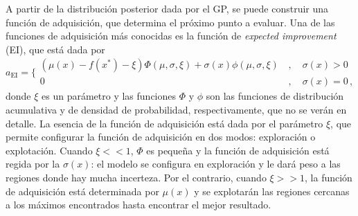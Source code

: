 A partir de la distribución posterior dada por el GP, se puede construir 
una función de adquisición, que determina el próximo punto a evaluar.
Una de las funciones de adquisición más conocidas es la función de 
\textit{expected improvement} (EI), que está dada por
\begin{equation}
 a_{\mathrm{EI}} = \bigg\{
 \begin{array}{ll}
 (\mu(x)-f(x^*)-\xi)\Phi(\mu,\sigma,\xi) 
 + \sigma(x)\phi(\mu,\sigma,\xi) &\,,\quad\sigma(x)>0\\
 0 &\,,\quad\sigma(x)=0\,,
 \end{array}
\end{equation}
donde $\xi$ es un parámetro y las funciones $\Phi$ y $\phi$ son las 
funciones de distribución acumulativa y de densidad de probabilidad, 
respectivamente, que no se verán en detalle. La esencia de la función 
de adquisición está dada por el parámetro $\xi$, que permite configurar 
la función de adquisición en dos modos: exploración o explotación. 
Cuando $\xi<<1$, $\Phi$ es pequeña y la función de adquisición está 
regida por la $\sigma(x)$: el modelo se configura en exploración y le 
dará peso a las regiones donde hay mucha incerteza. Por el contrario,
cuando $\xi>>1$, la función de adquisición está determinada por $\mu(x)$ 
y se explotarán las regiones cercanas a los máximos encontrados hasta 
encontrar el mejor resultado. 



